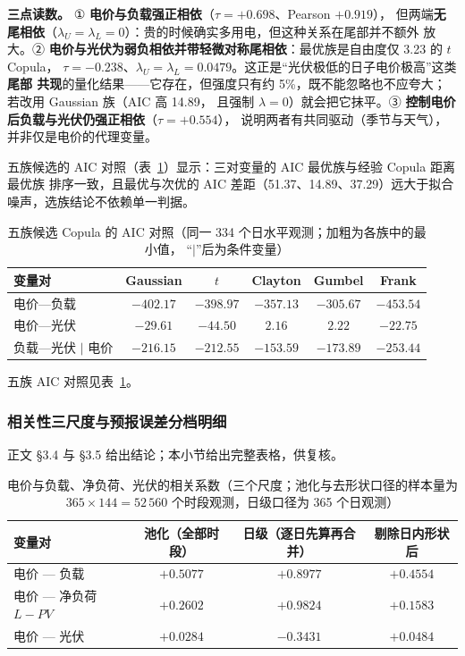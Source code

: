 \textbf{三点读数。} ① \textbf{电价与负载强正相依}（\(\tau=+0.698\)、Pearson \(+0.919\)），
但两端\textbf{无尾相依}（\(\lambda_U=\lambda_L=0\)）：贵的时候确实多用电，但这种关系在尾部并不额外
放大。② \textbf{电价与光伏为弱负相依并带轻微对称尾相依}：最优族是自由度仅 3.23 的 \(t\) Copula，
\(\tau=-0.238\)、\(\lambda_U=\lambda_L=0.0479\)。这正是“光伏极低的日子电价极高”这类\textbf{尾部
共现}的量化结果——它存在，但强度只有约 5\%，既不能忽略也不应夸大；若改用 Gaussian 族（AIC 高 14.89，
且强制 \(\lambda=0\)）就会把它抹平。③ \textbf{控制电价后负载与光伏仍强正相依}（\(\tau=+0.554\)），
说明两者有共同驱动（季节与天气），并非仅是电价的代理变量。

五族候选的 AIC 对照（表~\ref{tab:vine-cand}）显示：三对变量的 AIC 最优族与经验 Copula 距离最优族
排序一致，且最优与次优的 AIC 差距（51.37、14.89、37.29）远大于拟合噪声，选族结论不依赖单一判据。

\begin{table}[htbp]
  \centering
  \caption{五族候选 Copula 的 AIC 对照（同一 334 个日水平观测；加粗为各族中的最小值，
           “\(|\)”后为条件变量）}
  \label{tab:vine-cand}
  \small
  \begin{tabular}{lccccc}
    \toprule
    变量对 & Gaussian & \(t\) & Clayton & Gumbel & Frank \\
    \midrule
    电价—负载 & \(-402.17\) & \(-398.97\) & \(-357.13\) & \(-305.67\) & $\mathbf{-453.54}$ \\
    电价—光伏 & \(-29.61\) & $\mathbf{-44.50}$ & $2.16$ & $2.22$ & \(-22.75\) \\
    负载—光伏 \(|\) 电价 & \(-216.15\) & \(-212.55\) & \(-153.59\) & \(-173.89\) & $\mathbf{-253.44}$ \\
    \bottomrule
  \end{tabular}
\end{table}


五族 AIC 对照见表~\ref{tab:vine-cand}。


\subsubsection{相关性三尺度与预报误差分档明细}\label{sec:datadetail-app}

正文 \S3.4 与 \S3.5 给出结论；本小节给出完整表格，供复核。

\begin{table}[htbp]
  \centering
  \caption{电价与负载、净负荷、光伏的相关系数（三个尺度；池化与去形状口径的样本量为
           \(365\times144=52\,560\) 个时段观测，日级口径为 365 个日观测）}
  \label{tab:corr-app}
  \small
  \begin{tabular}{lccc}
    \toprule
    变量对 & 池化（全部时段） & 日级（逐日先算再合并） & 剔除日内形状后 \\
    \midrule
    电价 --- 负载 & \(+0.5077\) & \(+0.8977\) & \(+0.4554\) \\
    电价 --- 净负荷 \(L-PV\) & \(+0.2602\) & \(+0.9824\) & \(+0.1583\) \\
    电价 --- 光伏 & \(+0.0284\) & \(-0.3431\) & \(+0.0484\) \\
    \bottomrule
  \end{tabular}
\end{table}


